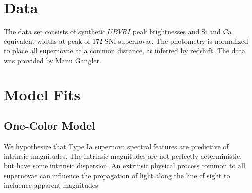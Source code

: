 \documentclass[11pt, oneside]{article}   	%
\begin{document}
\section{Data}
The data set consists of synthetic $UBVRI$ peak brightnesses and Si and Ca equivalent widths at peak
of 172 SNf supernovae.  The photometry is normalized to place all supernovae at a common distance, as
inferred by redshift.
The data was provided by Manu Gangler.

\section{Model Fits}
\subsection{One-Color Model}
We hypothesize that Type Ia supernova spectral features are predictive of intrinsic
magnitudes.  The intrinsic magnitudes are not perfectly deterministic, but have some intrinsic dispersion.
An extrinsic physical process common to all supernovae can influence the propagation
of light along the line of sight to incluence apparent magnitudes. 
\end{document}
